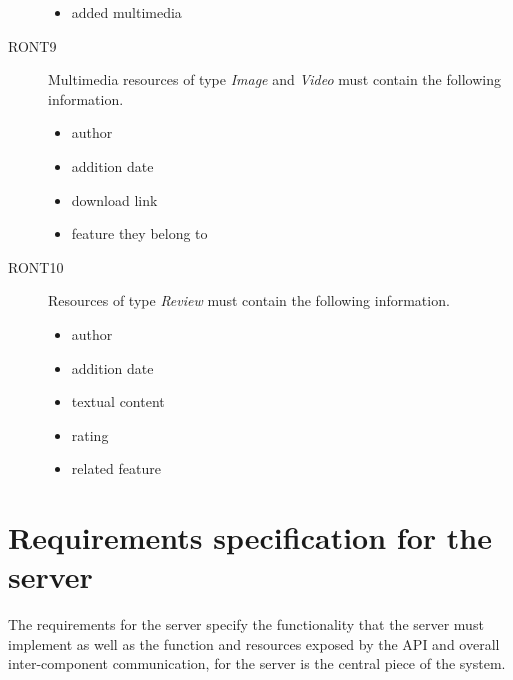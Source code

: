 \begin{description}
\begin{itemize}
\item added multimedia
\end{itemize}
\item[RONT9] Multimedia resources of type \textit{Image} and \textit{Video} must contain the following information.
\begin{itemize}
\item author
\item addition date
\item download link
\item feature they belong to
\end{itemize}
\item[RONT10] Resources of type \textit{Review} must contain the following information.
\begin{itemize}
\item author
\item addition date
\item textual content
\item rating
\item related feature
\end{itemize}
\end{description}

\section{Requirements specification for the server}

The requirements for the server specify the functionality that the server must implement as well as the function and resources exposed by the API and overall inter-component communication, for the server is the central piece of the system.

